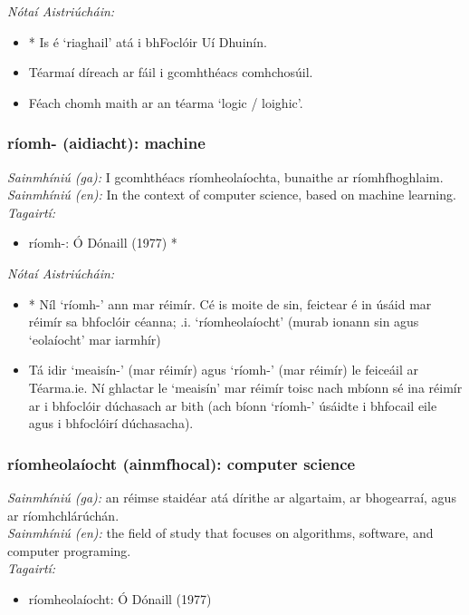  \noindent \textit{Nótaí Aistriúcháin:}
\begin{itemize}
	\item * Is é `riaghail' atá i bhFoclóir Uí Dhuinín.
	\item Téarmaí díreach ar fáil i gcomhthéacs comhchosúil.
	\item Féach chomh maith ar an téarma `logic / loighic'.
\end{itemize}


\subsubsection*{ríomh- (aidiacht): machine}
 \noindent \textit{Sainmhíniú (ga):} I gcomhthéacs ríomheolaíochta, bunaithe ar ríomhfhoghlaim.
\\
 \noindent \textit{Sainmhíniú (en):} In the context of computer science, based on machine learning.
\\
 \noindent \textit{Tagairtí:}
\begin{itemize}
	\item ríomh-: Ó Dónaill (1977) \cite{odonaill}*
\end{itemize}

 \noindent \textit{Nótaí Aistriúcháin:}
\begin{itemize}
	\item * Níl `ríomh-' ann mar réimír. Cé is moite de sin, feictear é in úsáid mar réimír sa bhfoclóir céanna; .i. `ríomheolaíocht' (murab ionann sin agus `eolaíocht' mar iarmhír)
	\item Tá idir `meaisín-' (mar réimír) agus `ríomh-' (mar réimír) le feiceáil ar Téarma.ie. Ní ghlactar le `meaisín' mar réimír toisc nach mbíonn sé ina réimír ar i bhfoclóir dúchasach ar bith (ach bíonn `ríomh-' úsáidte i bhfocail eile agus i bhfoclóirí dúchasacha).
\end{itemize}


\subsubsection*{ríomheolaíocht (ainmfhocal): computer science}
 \noindent \textit{Sainmhíniú (ga):} an réimse staidéar atá dírithe ar algartaim, ar bhogearraí, agus ar ríomhchlárúchán.
\\
 \noindent \textit{Sainmhíniú (en):} the field of study that focuses on algorithms, software, and computer programing.
\\
 \noindent \textit{Tagairtí:}
\begin{itemize}
	\item ríomheolaíocht: Ó Dónaill (1977) \cite{odonaill}
\end{itemize}

